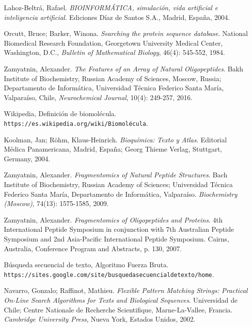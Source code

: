 \documentclass[letterpaper, 10pt, notitlepage]{report}
\begin{document}
\begin{thebibliography}{9}

Lahoz-Beltrá, Rafael.
\textit{BIOINFORMÁTICA, simulación, vida artificial e inteligencia artificial}. 
Ediciones Díaz de Santos S.A., Madrid, España, 2004.

Orcutt, Bruce; Barker, Winona.
\textit{Searching the protein sequence database}.
National Biomedical Research Foundation, Georgetown University Medical Center,
Washington, D.C., \textit{Bulletin of Mathematical Biology}, 46(4): 545-552, 1984.

Zamyatnin, Alexander.
\textit{The Features of an Array of Natural Oligopeptides}.
Bakh Institute of Biochemistry, Russian Academy of Sciences, Moscow, Russia;
Departamento de Informática, Universidad Técnica Federico Santa María, Valparaíso, Chile,
\textit{Neurochemical Journal}, 10(4): 249-257, 2016.

Wikipedia, Definición de biomolécula.
\\\texttt{https://es.wikipedia.org/wiki/Biomolécula}.

Koolman, Jan; Röhm, Klaus-Heinrich.
\textit{Bioquímica: Texto y Atlas}.
Editorial Médica Panamericana, Madrid, España;
Georg Thieme Verlag, Stuttgart, Germany, 2004.

Zamyatnin, Alexander.
\textit{Fragmentomics of Natural Peptide Structures}. 
Bach Institute of Biochemistry, Russian Academy of Sciences; Universidad Técnica Federico Santa María, Departamento de Informática, Valparaíso.
\textit{Biochemistry (Moscow)}, 74(13): 1575-1585, 2009.

Zamyatnin, Alexander.
\textit{Fragmentomics of Oligopeptides and Proteins}. 
4th International Peptide Symposium in conjunction with 7th Australian Peptide Symposium and 2nd Asia-Pacific International Peptide Symposium. Cairns, Australia, Conference Program and Abstracts, p. 130, 2007.

Búsqueda secuencial de texto, Algoritmo Fuerza Bruta.
\\\texttt{https://sites.google.com/site/busquedasecuencialdetexto/home}.

Navarro, Gonzalo; Raffinot, Mathieu.
\textit{Flexible Pattern Matching Strings: Practical On-Line Search Algorithms for Texts and Biological Sequences}.
Universidad de Chile; Centre Nationale de Recherche Scientifique, Marne-La-Vallee, Francia.
\textit{Cambridge University Press}, Nueva York, Estados Unidos, 2002.


\end{thebibliography}
\end{document}
